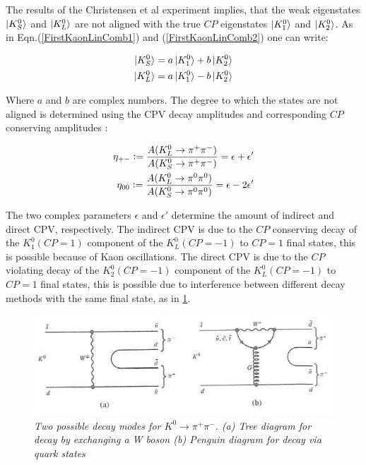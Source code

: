 The results of the Christensen et al experiment implies, that the weak eigenstates $\ket{K^{0}_{S}}$ and $\ket{K^{0}_{L}}$ are not aligned with the true $CP$ eigenstates $\ket{K^{0}_{1}}$ and $\ket{K^{0}_{2}}$. As in Eqn.(\ref{FirstKaonLinComb1}) and (\ref{FirstKaonLinComb2}) one can write:

\begin{align}
\label{KaonLincomb11}
\ket{K^{0}_{S}} = a \ket{K^{0}_{1}} + b \ket{K^{0}_{2}} \\
\label{KaonLincomb12}
\ket{K^{0}_{L}} = a \ket{K^{0}_{1}} - b \ket{K^{0}_{2}}
\end{align}

\noindent Where $a$ and $b$ are complex numbers. The degree to which the states are not aligned is determined using the CPV decay amplitudes and corresponding $CP$ conserving amplitudes \cite{Measurements_Direct_CPV_Kaons_KTev}: 

\begin{align*}
\eta_{+-} \vcentcolon= \frac{A(K^{0}_L \rightarrow \pi^+ \pi^-)}{A(K^{0}_S \rightarrow \pi^+ \pi^-)} = \epsilon + \epsilon' \\ 
\eta_{00} \vcentcolon= \frac{A(K^{0}_L \rightarrow \pi^0 \pi^0)}{A(K^{0}_S \rightarrow \pi^0 \pi^0)} = \epsilon - 2\epsilon' 
\end{align*}

\noindent The two complex parameters $\epsilon$ and $\epsilon'$ determine the amount of indirect and direct CPV, respectively. The indirect CPV is due to the $CP$ conserving decay of the $K^{0}_{1}(CP =1)$ component of the $K^{0}_{L}(CP=-1)$ to $CP=1$ final states, this is possible because of Kaon oscillations. The direct CPV is due to the $CP$ violating decay of the $K^{0}_{2}(CP =-1)$ component of the $K^{0}_{L}(CP=-1)$ to $CP=1$ final states, this is possible due to interference between different decay methods with the same final state, as in \cref{HEPP_intro_Perkins}.  

\begin{figure}[h!]
\begin{center}
\includegraphics[scale=0.3, angle=-1]{figs/Perkins_Interference_Kaons.png}
\end{center}
\caption{\textit{Two possible decay modes for $K^{0} \rightarrow \pi^+ \pi^-$. (a) Tree diagram for decay by exchanging a W boson (b) Penguin diagram for decay via quark states \cite{HEPP_intro_Perkins}}}
\label{HEPP_intro_Perkins}
\end{figure}

